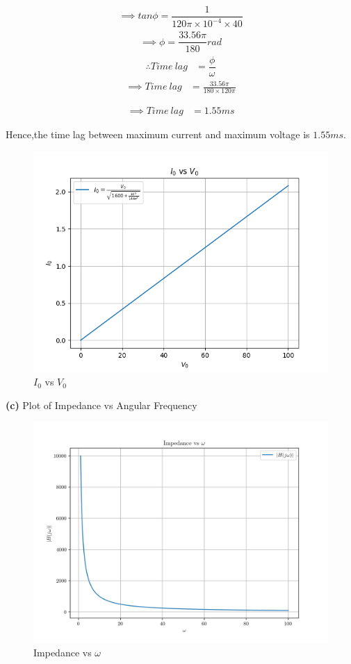 \documentclass[journal,12pt,twocolumn]{IEEEtran}
\theoremstyle{remark}
\begin{document}
\begin{align}
	\label{eq:tri-pts/13}\implies tan\phi=\dfrac{1}{120\pi \times 10^{-4} \times 40}
\end{align}
\begin{align}
	\label{eq:tri-pts/14}\implies \phi =\dfrac{33.56\pi}{180}rad
\end{align}
\begin{align}
	\label{eq:tri-pts/15} \therefore Time\: lag   &=\dfrac{\phi}{\omega}
\end{align}
\begin{align}
	\label{eq:tri-pts/16}\implies Time\: lag &= \frac{33.56\pi}{180 \times 120\pi}
\end{align}

\begin{align}
	\label{eq:tri-pts/17}\implies Time\: lag &= 1.55ms
\end{align}

Hence,the time lag between maximum current and maximum voltage is $1.55ms$.\\

\vspace{0.5cm}

\begin{figure}[h]
    \centering
    \includegraphics[width = 2.4 in, height = 1.6 in]{figs/fig5.png}
    \caption{$I_0$ vs $V_0$}
    \label{fig:h_plot}
\end{figure}

\textbf{(c)} Plot of Impedance vs Angular Frequency
\begin{figure}[h]
    \centering
    \includegraphics[width = 2.4 in, height = 1.6 in]{figs/fig3.png}
    \caption{Impedance vs $\omega$}
    \label{fig:h_plot}
\end{figure}
\end{document}
